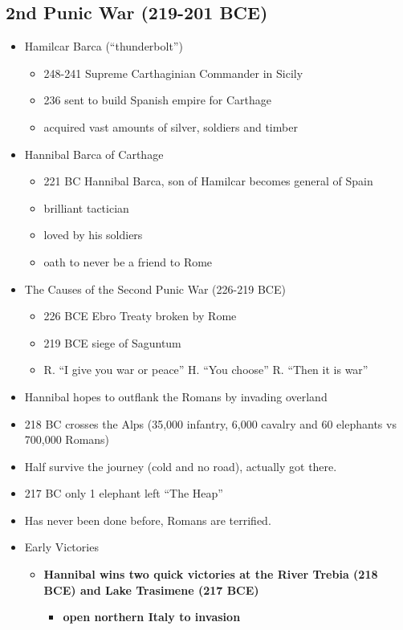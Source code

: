 \documentclass[12pt, twoside]{article}
\begin{document}
\subsection{2nd Punic War (219-201 BCE)}
\begin{itemize}
\item Hamilcar Barca (“thunderbolt”)
	\begin{itemize}
	\item 248-241 Supreme Carthaginian Commander in Sicily
	\item 236 sent to build Spanish empire for Carthage
	\item acquired vast amounts of silver, soldiers and timber
	\end{itemize}
\item Hannibal Barca of Carthage
	\begin{itemize}
	\item 221 BC Hannibal Barca, son of Hamilcar becomes general of Spain
	\item brilliant tactician
	\item loved by his soldiers
	\item oath to never be a friend to Rome
	\end{itemize}
\item The Causes of the Second Punic War (226-219 BCE)
	\begin{itemize}
	\item 226 BCE Ebro Treaty broken by Rome
	\item 219 BCE siege of Saguntum
	\item R. “I give you war or peace” H. “You choose” R. “Then it is war”
	\end{itemize}
\item Hannibal hopes to outflank the Romans by invading overland
\item 218 BC crosses the Alps (35,000 infantry, 6,000 cavalry and 60 elephants vs 700,000 Romans)
\item Half survive the journey (cold and no road), actually got there.
\item 217 BC only 1 elephant left “The Heap”
\item Has never been done before, Romans are terrified.
\item Early Victories
	\begin{itemize}
	\item \textbf{Hannibal wins two quick victories at the River Trebia (218 BCE) and Lake Trasimene (217 BCE)}
		\begin{itemize}
		\item \textbf{open northern Italy to invasion}

\end{itemize}
\end{itemize}
\end{itemize}
\end{document}
